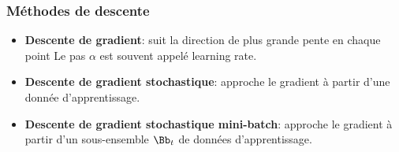 \documentclass[9pt,table]{beamer} %
\begin{document}
\begin{frame}
\frametitle{Méthodes de descente}

\begin{itemize}[label=\tiny$\blacksquare$]
	\item \textbf{Descente de gradient}: suit la direction de plus grande pente en chaque point
	Le pas $\alpha$ est souvent appelé \alert{learning rate}.
	\vfill
	\item \textbf{Descente de gradient \alert{stochastique}}: approche le gradient à partir d'une donnée d'apprentissage.
	\vfill
	\item \textbf{Descente de gradient \alert{stochastique mini-batch}}: approche le gradient à partir d'un sous-ensemble $\Bb_t$ de données d'apprentissage.
\end{itemize}
\end{frame}
\end{document}
